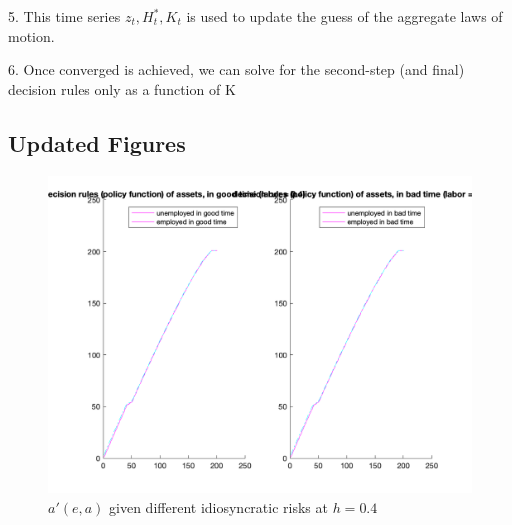 5. This time series ${z_t,H^*_t,K_t}$ is used to update the guess of the aggregate laws of motion.

6. Once converged is achieved, we can solve for the second-step (and final) decision rules only as a function of K

\pagebreak

\subsection{Updated Figures}

\begin{figure}[htbp]
\centering
\includegraphics[width=\textwidth]{img/Q2_1_plot.png}
\caption{$a'(e,a)$  given different idiosyncratic risks at $h=0.4$}
\end{figure}


 



